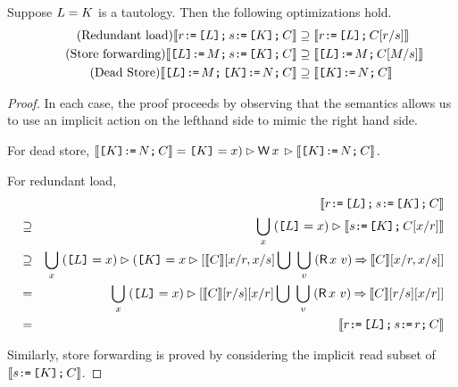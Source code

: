 \begin{lemma}
  Suppose $L=K$ is a tautology.  Then the following optimizations hold.
\begin{align*}
  \tag{Redundant load}
  \llbracket r \texttt{:}\mkern-1mu\texttt{=}\, \texttt{[}L\texttt{]} \texttt{;}\, s \texttt{:}\mkern-1mu\texttt{=}\, \texttt{[}K\texttt{]}  \texttt{;}\, C\rrbracket &\supseteq
  \llbracket r \texttt{:}\mkern-1mu\texttt{=}\, \texttt{[}L\texttt{]} \texttt{;}\, C[r/s]\rrbracket \\
  \tag{Store forwarding} 
  \llbracket\texttt{[}L\texttt{]} \texttt{:}\mkern-1mu\texttt{=}\, M \texttt{;}\, s \texttt{:}\mkern-1mu\texttt{=}\, \texttt{[}K\texttt{]} \texttt{;}\, C\rrbracket &\supseteq 
  \llbracket\texttt{[}L\texttt{]} \texttt{:}\mkern-1mu\texttt{=}\, M \texttt{;}\, C[M/s]\rrbracket \\
  \tag{Dead Store} 
  \llbracket\texttt{[}L\texttt{]} \texttt{:}\mkern-1mu\texttt{=}\, M \texttt{;}\, \texttt{[}K\texttt{]} \texttt{:}\mkern-1mu\texttt{=}\, N \texttt{;}\, C\rrbracket &\supseteq 
  \llbracket\texttt{[}K\texttt{]} \texttt{:}\mkern-1mu\texttt{=}\, N \texttt{;}\, C\rrbracket
\end{align*}
\begin{proof}
  In each case, the proof proceeds by observing that the semantics allows us to use an implicit action on the lefthand side to mimic the right hand side.  

For dead store,
  $\sem{\REF{\dExp} \GETS \bExp \SEMI \aCmd} = \REF{\dExp}=\aLoc) \guard \DW{\aLoc}{} \guard \sem{\REF{\dExp} \GETS \bExp \SEMI \aCmd}$.


For redundant load, 
\begin{eqnarray*}
&& \sem{\aReg \GETS \REF{\cExp} \SEMI \bReg \GETS \REF{\dExp}  \SEMI \aCmd} \\
&\supseteq&  \bigcup_\aLoc\; (\REF{\cExp}=\aLoc) \guard  \sem{ \bReg  \GETS \REF{\dExp} \SEMI \aCmd[\aLoc/\aReg]} \\
&\supseteq&  \bigcup_\aLoc\; (\REF{\cExp}=\aLoc) \guard  ( \REF{\dExp}=\aLoc \guard [ \sem{\aCmd}[\aLoc/\aReg,\aLoc/\bReg] \bigcup\  \bigcup_\aVal\;  (\DR\aLoc\aVal) \prefix \sem{\aCmd}[\aLoc/\aReg,\aLoc/\bReg]]\\
&=& \bigcup_\aLoc\; (\REF{\cExp}=\aLoc) \guard  [ \sem{\aCmd}[\aReg/ \bReg][\aLoc/\aReg] \bigcup\  \bigcup_\aVal\;  (\DR\aLoc\aVal) \prefix \sem{\aCmd}[\aReg/ \bReg][\aLoc/\aReg]]\\
&=& \sem{\aReg \GETS \REF{\cExp} \SEMI \bReg \GETS \aReg \SEMI \aCmd} 
\end{eqnarray*}

Similarly, store forwarding is proved by considering the implicit read subset of $\llbracket s \texttt{:}\mkern-1mu\texttt{=}\, \texttt{[}K\texttt{]} \texttt{;}\, C\rrbracket$.

\end{proof}
\end{lemma}
  
